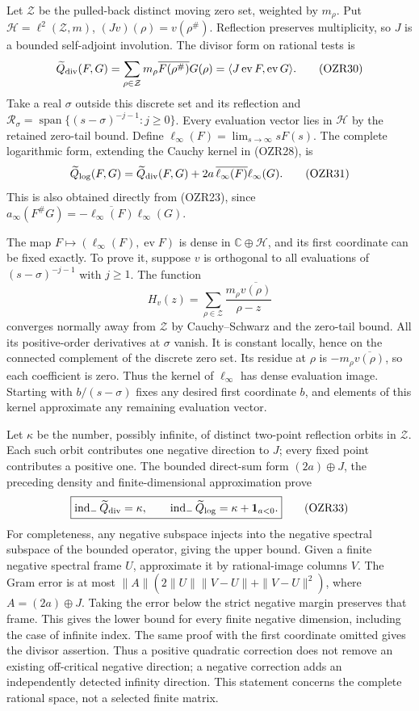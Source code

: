 \documentclass[
  10pt,
  a4paper,
]{article}
\begin{document}
Let \(\mathcal Z\) be the pulled-back distinct moving zero set, weighted
by \(m_\rho\). Put \(\mathcal H=\ell^2(\mathcal Z,m)\),
\((Jv)(\rho)=v(\rho^\#)\). Reflection preserves multiplicity, so \(J\)
is a bounded self-adjoint involution. The divisor form on rational tests
is \[
\widetilde Q_{\rm div}(F,G)
=\sum_{\rho\in\mathcal Z}m_\rho
 \overline{F(\rho^\#)}G(\rho)
=\langle J\operatorname{ev}F,\operatorname{ev}G\rangle.
\tag{OZR30}
\] Take a real \(\sigma\) outside this discrete set and its reflection
and
\(\mathcal R_\sigma=\operatorname{span}\{(s-\sigma)^{-j-1}:j\ge0\}\).
Every evaluation vector lies in \(\mathcal H\) by the retained zero-tail
bound. Define \(\ell_\infty(F)=\lim_{s\to\infty}sF(s)\). The complete
logarithmic form, extending the Cauchy kernel in (OZR28), is \[
\widetilde Q_{\log}(F,G)=\widetilde Q_{\rm div}(F,G)
 +2a\,\overline{\ell_\infty(F)}\ell_\infty(G).
\tag{OZR31}
\] This is also obtained directly from (OZR23), since
\(a_\infty(F^\#G)=-\overline{\ell_\infty(F)}\ell_\infty(G)\).

The map \(F\mapsto(\ell_\infty(F),\operatorname{ev}F)\) is dense in
\(\mathbb C\oplus\mathcal H\), and its first coordinate can be fixed
exactly. To prove it, suppose \(v\) is orthogonal to all evaluations of
\((s-\sigma)^{-j-1}\) with \(j\ge1\). The function \[
H_v(z)=\sum_{\rho\in\mathcal Z}
 \frac{m_\rho\overline{v(\rho)}}{\rho-z}
\tag{OZR32}
\] converges normally away from \(\mathcal Z\) by Cauchy--Schwarz and
the zero-tail bound. All its positive-order derivatives at \(\sigma\)
vanish. It is constant locally, hence on the connected complement of the
discrete zero set. Its residue at \(\rho\) is
\(-m_\rho\overline{v(\rho)}\), so each coefficient is zero. Thus the
kernel of \(\ell_\infty\) has dense evaluation image. Starting with
\(b/(s-\sigma)\) fixes any desired first coordinate \(b\), and elements
of this kernel approximate any remaining evaluation vector.

Let \(\kappa\) be the number, possibly infinite, of distinct two-point
reflection orbits in \(\mathcal Z\). Each such orbit contributes one
negative direction to \(J\); every fixed point contributes a positive
one. The bounded direct-sum form \((2a)\oplus J\), the preceding density
and finite-dimensional approximation prove \[
\boxed{\operatorname{ind}_-\widetilde Q_{\rm div}=\kappa,
\qquad \operatorname{ind}_-\widetilde Q_{\log}
=\kappa+\mathbf1_{a<0}.}
\tag{OZR33}
\] For completeness, any negative subspace injects into the negative
spectral subspace of the bounded operator, giving the upper bound. Given
a finite negative spectral frame \(U\), approximate it by rational-image
columns \(V\). The Gram error is at most
\(\|A\|(2\|U\|\|V-U\|+\|V-U\|^2)\), where \(A=(2a)\oplus J\). Taking the
error below the strict negative margin preserves that frame. This gives
the lower bound for every finite negative dimension, including the case
of infinite index. The same proof with the first coordinate omitted
gives the divisor assertion. Thus a positive quadratic correction does
not remove an existing off-critical negative direction; a negative
correction adds an independently detected infinity direction. This
statement concerns the complete rational space, not a selected finite
matrix.
\end{document}
